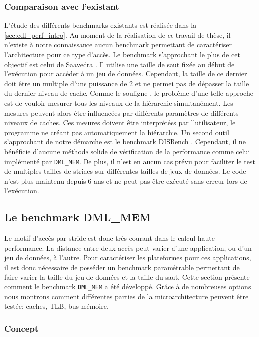     \subsubsection{Comparaison avec l'existant}
        L'étude des différents benchmarks existants est réalisée dans la \autoref{sec:edl_perf_intro}.  Au moment de la réalisation de ce travail de thèse, il n’existe à notre connaissance aucun benchmark permettant de caractériser l’architecture pour ce type d’accès. Le benchmark s’approchant le plus de cet objectif est celui de Saavedra \cite{Saavedra1995}. Il utilise une taille de saut fixée au début de l’exécution pour accéder à un jeu de données. Cependant, la taille de ce dernier doit être un multiple d’une puissance de 2 et ne permet pas de dépasser la taille du dernier niveau de cache. Comme le souligne \cite{Yotov2005}, le problème d’une telle approche est de vouloir mesurer tous les niveaux de la hiérarchie simultanément. Les mesures peuvent alors être influencées par différents paramètres de différents niveaux de caches. Ces mesures doivent être interprétées par l’utilisateur, le programme ne créant pas automatiquement la hiérarchie. Un second outil s'approchant de notre démarche est le benchmark DISBench \cite{disbench}. Cependant, il ne bénéficie d'aucune méthode solide de vérification de la performance comme celui implémenté par \verb=DML_MEM=. De plus, il n'est en aucun cas prévu pour faciliter le test de multiples tailles de strides sur différentes tailles de jeux de données. Le code n'est plus maintenu depuis 6 ans et ne peut pas être exécuté sans erreur lors de l'exécution.


\subsection{Le benchmark DML\_MEM}
    Le motif d'accès par \gls{stride} est donc très courant dans le calcul haute performance. La distance entre deux accès peut varier d'une application, ou d'un jeu de données, à l'autre. Pour caractériser les plateformes pour ces applications, il est donc nécessaire de posséder un benchmark paramétrable permettant de faire varier la taille du jeu de données et la taille du saut. Cette section présente comment le benchmark \verb=DML_MEM= a été développé. Grâce à de nombreuses options nous montrons comment différentes parties de la microarchitecture peuvent être testée: caches, TLB, bus mémoire.


    \subsubsection{Concept}
        
